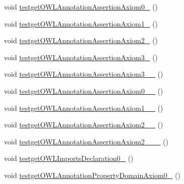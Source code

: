 \begin{DoxyCompactItemize}
\item 
void \hyperlink{classorg_1_1semanticweb_1_1owlapi_1_1api_1_1test_1_1_null_check_test_case_a9cb697e308908e4fb37be490173a5a1b}{testget\-O\-W\-L\-Annotation\-Assertion\-Axiom0\-\_} ()
\item 
void \hyperlink{classorg_1_1semanticweb_1_1owlapi_1_1api_1_1test_1_1_null_check_test_case_a1e04926bf152eb82fd342ca485cd246d}{testget\-O\-W\-L\-Annotation\-Assertion\-Axiom1\-\_} ()
\item 
void \hyperlink{classorg_1_1semanticweb_1_1owlapi_1_1api_1_1test_1_1_null_check_test_case_a34ffa95c0d7555ed771ccb65f6bdb06b}{testget\-O\-W\-L\-Annotation\-Assertion\-Axiom2\-\_} ()
\item 
void \hyperlink{classorg_1_1semanticweb_1_1owlapi_1_1api_1_1test_1_1_null_check_test_case_aeb6c22386f4b44ad3b5fd60c0c3a5105}{testget\-O\-W\-L\-Annotation\-Assertion\-Axiom3\-\_} ()
\item 
void \hyperlink{classorg_1_1semanticweb_1_1owlapi_1_1api_1_1test_1_1_null_check_test_case_ab0ed5205b7cd0736e5f765cf2ca4e840}{testget\-O\-W\-L\-Annotation\-Assertion\-Axiom3\-\_\-\_} ()
\item 
void \hyperlink{classorg_1_1semanticweb_1_1owlapi_1_1api_1_1test_1_1_null_check_test_case_af90d408249e6030b196325f3fe6bcd6d}{testget\-O\-W\-L\-Annotation\-Assertion\-Axiom0\-\_\-\_} ()
\item 
void \hyperlink{classorg_1_1semanticweb_1_1owlapi_1_1api_1_1test_1_1_null_check_test_case_abf202c1c67ffb324ffd65042bd2dd1f3}{testget\-O\-W\-L\-Annotation\-Assertion\-Axiom1\-\_\-\_} ()
\item 
void \hyperlink{classorg_1_1semanticweb_1_1owlapi_1_1api_1_1test_1_1_null_check_test_case_a4e635d1db75bb5f78d195b2a73052812}{testget\-O\-W\-L\-Annotation\-Assertion\-Axiom2\-\_\-\_} ()
\item 
void \hyperlink{classorg_1_1semanticweb_1_1owlapi_1_1api_1_1test_1_1_null_check_test_case_ad53f0445282d7b86045f4151590b995b}{testget\-O\-W\-L\-Annotation\-Assertion\-Axiom2\-\_\-\_\-\_} ()
\item 
void \hyperlink{classorg_1_1semanticweb_1_1owlapi_1_1api_1_1test_1_1_null_check_test_case_aef7476b9f4f9888a724cbda6ff2c56fb}{testget\-O\-W\-L\-Imports\-Declaration0\-\_} ()
\item 
void \hyperlink{classorg_1_1semanticweb_1_1owlapi_1_1api_1_1test_1_1_null_check_test_case_a81b884b96794f8c470f790f3c62385c0}{testget\-O\-W\-L\-Annotation\-Property\-Domain\-Axiom0\-\_} ()
\item 

\end{DoxyCompactItemize}
